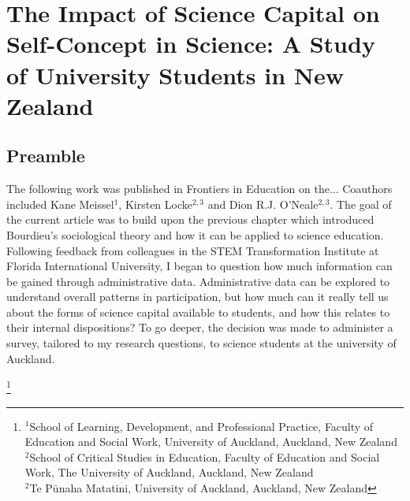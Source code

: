 \chapter[The Impact of Science Capital on Self-Concept in Science][]{The Impact of Science Capital on Self-Concept in Science: A Study of University Students in New Zealand}

\section{Preamble}
The following work was published in Frontiers in Education on the... Coauthors included Kane Meissel$^1$, Kirsten Locke$^{2,3}$ and Dion R.J. O'Neale$^{2,3}$. The goal of the current article was to build upon the previous chapter which introduced Bourdieu's sociological theory and how it can be applied to science education. Following feedback from colleagues in the STEM Transformation Institute at Florida International University, I began to question how much information can be gained through administrative data. Administrative data can be explored to understand overall patterns in participation, but how much can it really tell us about the forms of science capital available to students, and how this relates to their internal dispositions? To go deeper, the decision was made to administer a survey, tailored to my research questions, to science students at the university of Auckland.

\footnote{$^{1}$School of Learning, Development, and Professional Practice, Faculty of Education and Social Work, University of Auckland, Auckland, New Zealand \\
$^{2}$School of Critical Studies in Education, Faculty of Education and Social Work, The University of Auckland, Auckland, New Zealand \\
$^{2}$Te P\={u}naha Matatini, University of Auckland, Auckland, New Zealand }



